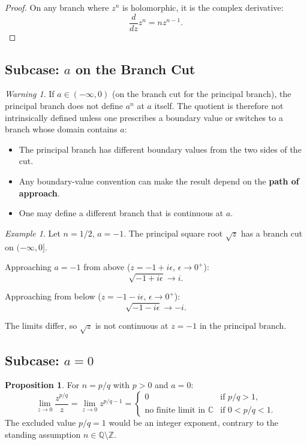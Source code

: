 \documentclass{article}
\theoremstyle{definition}
\newtheorem{proposition}{Proposition}[section]
\theoremstyle{remark}
\newtheorem{example}{Example}[section]
\newtheorem{warning}{Warning}[section]
\newcommand{\C}{\mathbb{C}}
\newcommand{\Z}{\mathbb{Z}}
\newcommand{\Q}{\mathbb{Q}}
\begin{document}
\begin{proof}
On any branch where $z^n$ is holomorphic, it is the complex derivative:
\begin{equation}
\frac{d}{dz} z^n = n z^{n-1}.
\end{equation}
\end{proof}

\subsection{Subcase: $a$ on the Branch Cut}

\begin{warning}
If $a \in (-\infty, 0)$ (on the branch cut for the principal branch), the principal branch does not define $a^n$ at $a$ itself. The quotient is therefore not intrinsically defined unless one prescribes a boundary value or switches to a branch whose domain contains $a$:
\begin{itemize}
    \item The principal branch has different boundary values from the two sides of the cut.
    \item Any boundary-value convention can make the result depend on the \textbf{path of approach}.
    \item One may define a different branch that is continuous at $a$.
\end{itemize}
\end{warning}

\begin{example}
Let $n = 1/2$, $a = -1$. The principal square root $\sqrt{z}$ has a branch cut on $(-\infty, 0]$.

Approaching $a = -1$ from above ($z = -1 + i\epsilon$, $\epsilon \to 0^+$):
\[
\sqrt{-1 + i\epsilon} \to i.
\]

Approaching from below ($z = -1 - i\epsilon$, $\epsilon \to 0^+$):
\[
\sqrt{-1 - i\epsilon} \to -i.
\]

The limits differ, so $\sqrt{z}$ is not continuous at $z = -1$ in the principal branch.
\end{example}

\subsection{Subcase: $a = 0$}

\begin{proposition}
For $n = p/q$ with $p > 0$ and $a = 0$:
\begin{equation}
\lim_{z \to 0} \frac{z^{p/q}}{z} = \lim_{z \to 0} z^{p/q - 1} = 
\begin{cases}
0 & \text{if } p/q > 1, \\
\text{no finite limit in } \C & \text{if } 0 < p/q < 1.
\end{cases}
\end{equation}
The excluded value $p/q = 1$ would be an integer exponent, contrary to the
standing assumption $n \in \Q \setminus \Z$.
\end{proposition}
\end{document}
